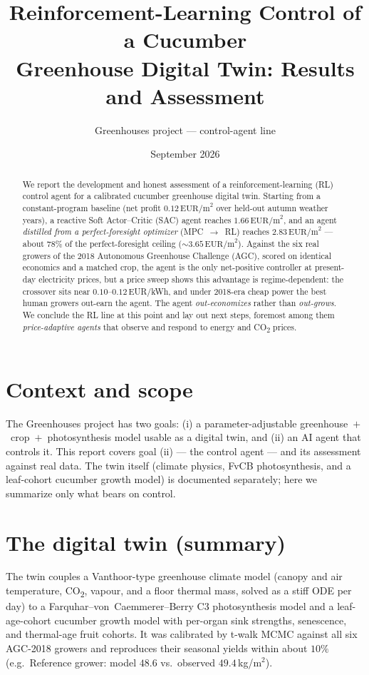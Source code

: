 \documentclass[11pt]{article}
\title{\textbf{Reinforcement-Learning Control of a Cucumber\\Greenhouse Digital Twin: Results and Assessment}}
\author{Greenhouses project --- control-agent line}
\date{September 2026}
\newcommand{\eurpm}{\,\text{EUR/m}^2}
\begin{document}
\maketitle

\begin{abstract}
\noindent
We report the development and honest assessment of a reinforcement-learning (RL)
control agent for a calibrated cucumber greenhouse digital twin. Starting from a
constant-program baseline (net profit $0.12\eurpm$ over held-out autumn weather
years), a reactive Soft Actor--Critic (SAC) agent reaches $1.66\eurpm$, and an
agent \emph{distilled from a perfect-foresight optimizer} (MPC~$\to$~RL) reaches
$2.83\eurpm$ --- about $78\%$ of the perfect-foresight ceiling ($\sim 3.65\eurpm$).
Against the six real growers of the 2018 Autonomous Greenhouse Challenge (AGC),
scored on identical economics and a matched crop, the agent is the only
net-positive controller at present-day electricity prices, but a price sweep shows
this advantage is regime-dependent: the crossover sits near
$0.10\text{--}0.12$\,EUR/kWh, and under 2018-era cheap power the best human growers
out-earn the agent. The agent \emph{out-economizes} rather than \emph{out-grows}.
We conclude the RL line at this point and lay out next steps, foremost among them
\emph{price-adaptive agents} that observe and respond to energy and CO\textsubscript{2}
prices.
\end{abstract}

\section{Context and scope}
The Greenhouses project has two goals: (i) a parameter-adjustable
greenhouse~$+$~crop~$+$~photosynthesis model usable as a digital twin, and
(ii) an AI agent that controls it. This report covers goal (ii) --- the control
agent --- and its assessment against real data. The twin itself (climate physics,
FvCB photosynthesis, and a leaf-cohort cucumber growth model) is documented
separately; here we summarize only what bears on control.

\section{The digital twin (summary)}
The twin couples a Vanthoor-type greenhouse climate model (canopy and air
temperature, CO\textsubscript{2}, vapour, and a floor thermal mass, solved as a stiff ODE per
day) to a Farquhar--von~Caemmerer--Berry C3 photosynthesis model and a
leaf-age-cohort cucumber growth model with per-organ sink strengths, senescence,
and thermal-age fruit cohorts. It was calibrated by t-walk MCMC against all six
AGC-2018 growers and reproduces their seasonal yields within about $10\%$
(e.g.\ Reference grower: model $48.6$ vs.\ observed $49.4$\,kg/m$^2$).
\end{document}
